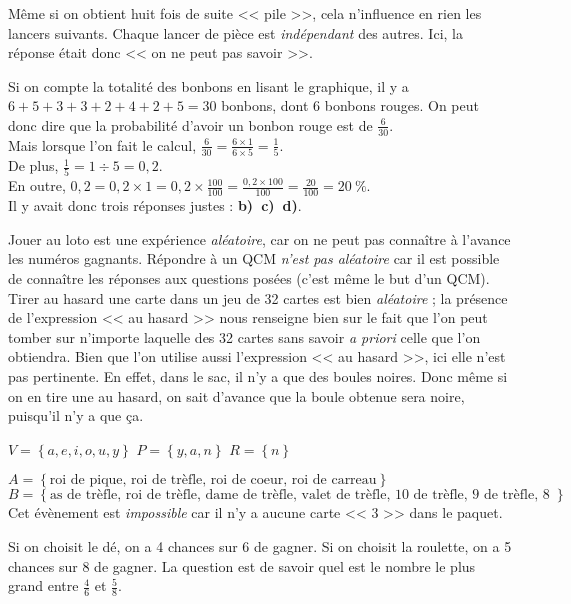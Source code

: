 \documentclass["../Cours.tex"]{subfiles}
\begin{document}
\begin{questions}
    \exercice Même si on obtient huit fois de suite << pile >>, cela n'influence en rien les lancers suivants. Chaque lancer de pièce est \emph{indépendant} des autres. Ici, la réponse était donc << on ne peut pas savoir >>.

    \exercice Si on compte la totalité des bonbons en lisant le graphique, il y a $6+5+3+3+2+4+2+5=30$ bonbons, dont 6 bonbons rouges. On peut donc dire que la probabilité d'avoir un bonbon rouge est de $\frac{6}{30}$. \\
    Mais lorsque l'on fait le calcul, $\frac{6}{30} = \frac{6 \times 1}{6 \times 5} = \frac{1}{5}$.\\
    De plus, $\frac{1}{5} = 1 \div 5 = 0{,}2$.\\
    En outre, $0,2 = 0,2 \times 1 = 0,2 \times \frac{100}{100} = \frac{0,2 \times 100}{100} = \frac{20}{100} = 20~\%$.\\
    Il y avait donc trois réponses justes : \textbf{b)~c)~d)}.

    \exercice 
    \question Jouer au loto est une expérience \emph{aléatoire}, car on ne peut pas connaître à l'avance les numéros gagnants.
    \question Répondre à un QCM \emph{n'est pas aléatoire} car il est possible de connaître les réponses aux questions posées (c'est même le but d'un QCM).
    \question Tirer au hasard une carte dans un jeu de 32 cartes est bien \emph{aléatoire} ; la présence de l'expression << au hasard >> nous renseigne bien sur le fait que l'on peut tomber sur n'importe laquelle des 32 cartes sans savoir \emph{a priori} celle que l'on obtiendra.
    \question Bien que l'on utilise aussi l'expression << au hasard >>, ici elle n'est pas pertinente. En effet, dans le sac, il n'y a que des boules noires. Donc même si on en tire une au hasard, on sait d'avance que la boule obtenue sera noire, puisqu'il n'y a que ça.

    \exercice 
    \question $V = \left\{ a, e, i, o, u, y \right\}$
    \question $P = \left\{ y, a, n \right\}$
    \question $R = \left\{ n \right\}$

    \exercice 
    \question
        \subquestion $A = \left\{ \mbox{roi de pique, roi de trèfle, roi de coeur, roi de carreau} \right\}$
        \subquestion $B = \left\{ \mbox{as de trèfle, roi de trèfle, dame de trèfle, valet de trèfle, 10 de trèfle, 9 de trèfle, 8 de trèfle, 7 de trèfle} \right\}$
    \question Cet évènement est \emph{impossible} car il n'y a aucune carte << 3 >> dans le paquet.

    \exercice Si on choisit le dé, on a 4 chances sur 6 de gagner. Si on choisit la roulette, on a 5 chances sur 8 de gagner. La question est de savoir quel est le nombre le plus grand entre $\frac{4}{6}$ et $\frac{5}{8}$.\\


\end{questions}
\end{document}
